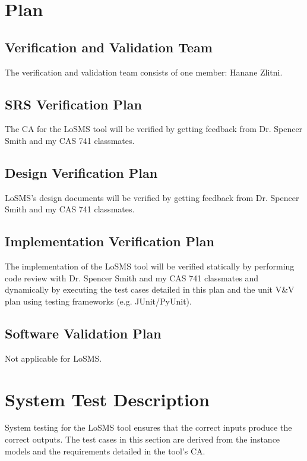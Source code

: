 \documentclass[12pt, titlepage]{article}
\newcommand{\famname}{LoSMS} %
\begin{document}
\section{Plan} \label{Plan}
	
\subsection{Verification and Validation Team}

The verification and validation team consists of one member: Hanane Zlitni.

\subsection{SRS Verification Plan}

The CA for the \famname{} tool will be verified by getting feedback from Dr. 
Spencer Smith and my CAS 741 classmates.

\subsection{Design Verification Plan}

\famname{}'s design documents will be verified by getting feedback from 
Dr. Spencer Smith and my CAS 741 classmates.

\subsection{Implementation Verification Plan}

The implementation of the \famname{} tool will be verified statically by 
performing code review with Dr. Spencer Smith and my CAS 741 classmates and 
dynamically by executing the test cases detailed in this plan and the unit V\&V 
plan using testing frameworks (e.g. JUnit/PyUnit).
 
\subsection{Software Validation Plan}

Not applicable for \famname{}.

\section{System Test Description} \label{SystemTestDescription}

System testing for the \famname{} tool ensures that the correct inputs produce 
the correct outputs. The test cases in this section are derived from the 
instance models and the requirements detailed in the tool's CA.
	
\end{document}
